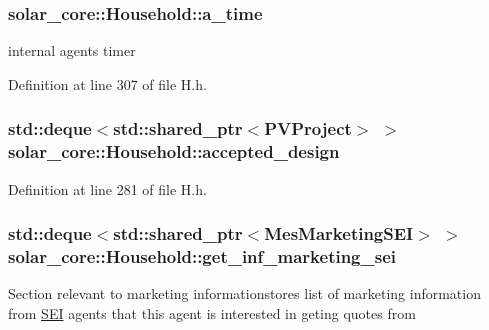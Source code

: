\subsubsection[{a\+\_\+time}]{ solar\+\_\+core\+::\+Household\+::a\+\_\+time\hspace{0.3cm}{\ttfamily [protected]}}\label{classsolar__core_1_1_household_ad323100235079f34537ccda656e86e64}
internal agent\textquotesingle{}s timer 

Definition at line 307 of file H.\+h.

\hypertarget{classsolar__core_1_1_household_ad4409e81251bdd33d9dca1cd1225dc75}{}
\subsubsection[{accepted\+\_\+design}]{\setlength{\rightskip}{0pt plus 5cm}std\+::deque$<$std\+::shared\+\_\+ptr$<${\bf P\+V\+Project}$>$ $>$ solar\+\_\+core\+::\+Household\+::accepted\+\_\+design\hspace{0.3cm}{\ttfamily [protected]}}\label{classsolar__core_1_1_household_ad4409e81251bdd33d9dca1cd1225dc75}


Definition at line 281 of file H.\+h.

\hypertarget{classsolar__core_1_1_household_a3ae4cec5fca43ee5ca3287a01f5a05a2}{}
\subsubsection[{get\+\_\+inf\+\_\+marketing\+\_\+sei}]{\setlength{\rightskip}{0pt plus 5cm}std\+::deque$<$std\+::shared\+\_\+ptr$<${\bf Mes\+Marketing\+S\+E\+I}$>$ $>$ solar\+\_\+core\+::\+Household\+::get\+\_\+inf\+\_\+marketing\+\_\+sei\hspace{0.3cm}{\ttfamily [protected]}}\label{classsolar__core_1_1_household_a3ae4cec5fca43ee5ca3287a01f5a05a2}
Section relevant to marketing informationstores list of marketing information from \hyperlink{classsolar__core_1_1_s_e_i}{S\+E\+I} agents that this agent is interested in geting quotes from 

